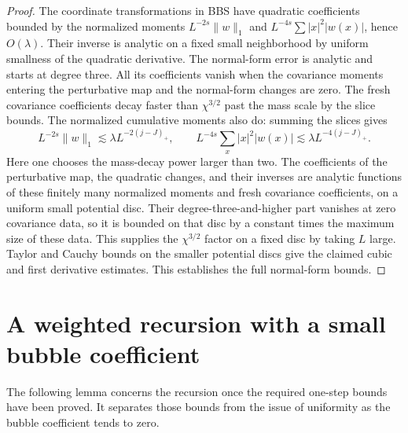 \documentclass[11pt]{article}
\begin{document}
\begin{proof}
The coordinate transformations in BBS have
quadratic coefficients bounded by the normalized
moments \(L^{-2s}\|w\|_1\) and
\(L^{-4s}\sum |x|^2|w(x)|\), hence \(O(\lambda)\).
Their inverse is analytic on a fixed small
neighborhood by uniform smallness of the quadratic
derivative. The normal-form error is analytic and starts at
degree three. All its coefficients vanish when
the covariance moments entering the perturbative map
and the normal-form changes are zero. The fresh
covariance coefficients decay faster than
\(\chi^{3/2}\) past the mass scale by the slice bounds.
The normalized cumulative moments also do: summing
the slices gives
\[
 L^{-2s}\|w\|_1\lesssim \lambda L^{-2(j-J)_+},\qquad
 L^{-4s}\sum_x |x|^2|w(x)|
   \lesssim\lambda L^{-4(j-J)_+}.
\]
Here one chooses the mass-decay power larger than
two. The coefficients of the perturbative map, the
quadratic changes, and their inverses are analytic
functions of these finitely many normalized moments
and fresh covariance coefficients, on a uniform
small potential disc. Their degree-three-and-higher
part vanishes at zero covariance data, so it is
bounded on that disc by a constant times the maximum
size of these data. This supplies the
\(\chi^{3/2}\) factor on a fixed disc by taking \(L\)
large. Taylor and Cauchy bounds on the smaller
potential discs give the claimed cubic and first
derivative estimates. This establishes the full
normal-form bounds.
\end{proof}

\section{A weighted recursion with a small bubble coefficient}

The following lemma concerns the recursion once the required one-step
bounds have been proved. It separates those bounds from the issue of
uniformity as the bubble coefficient tends to zero.
\end{document}
